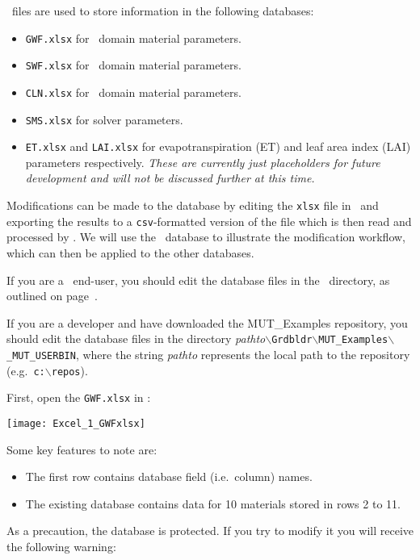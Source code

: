 \label{Appendix:ExcelUseage} 
\excel\ files are used to store information in the following databases:
\begin{itemize}
  \item \texttt{GWF.xlsx} for \gwf\ domain material parameters.
  \item \texttt{SWF.xlsx} for \swf\ domain material parameters.
  \item \texttt{CLN.xlsx} for \cln\ domain material parameters.
  \item \texttt{SMS.xlsx} for solver parameters.
  \item \texttt{ET.xlsx} and  \texttt{LAI.xlsx} for evapotranspiration (ET) and leaf area index (LAI) parameters respectively.  {\em These are currently just placeholders for future development and will not be discussed further at this time.}
\end{itemize}
 
Modifications can be made to the database by editing the \texttt{xlsx} file in \excel\ and exporting the results to a \texttt{csv}-formatted version of the file which is then read and processed by \mut.  We will use the \gwf\ database to illustrate the modification workflow, which can then be applied to the other databases.

If you are a \mut\ end-user, you should edit the database files in the \bin\ directory, as outlined on page~\pageref{page:userbin}.  

If you are a developer and have downloaded the MUT\_Examples repository, you should edit the database files in the directory \textit{pathto}\texttt{$\backslash$Grdbldr$\backslash$MUT\_Examples$\backslash$\_MUT\_USERBIN},
where the string \textit{pathto} represents the local path to the repository (e.g.\ \texttt{c:$\backslash$repos}).

First, open the \texttt{GWF.xlsx} in \excel:

    \texttt{[image: Excel\_1\_GWFxlsx]}

Some key features to note are:
\begin{itemize}
    \item The first row contains database field (i.e.\ column) names.
    \item The existing database contains data for 10 materials stored in rows 2 to 11.
\end{itemize}

As a precaution, the database is protected.  If you try to modify it you will receive the following warning: 

